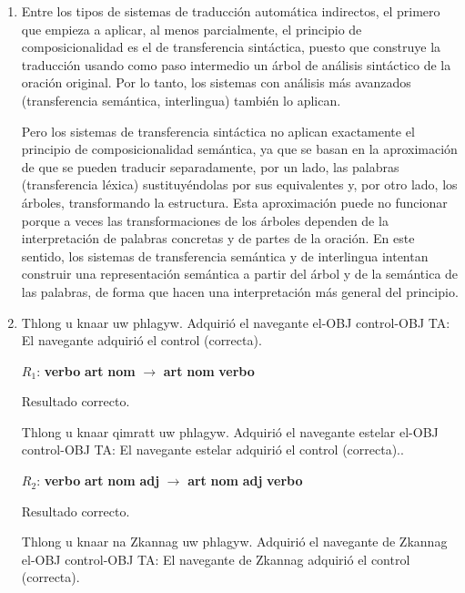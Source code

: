 \begin{enumerate}
\item Entre los tipos de sistemas de traducción automática indirectos, el primero que empieza a aplicar, al menos parcialmente, el principio de composicionalidad es el de transferencia sintáctica, puesto que construye la traducción usando como paso intermedio un árbol de análisis sintáctico de la oración original. Por lo tanto, los sistemas con análisis más avanzados (transferencia semántica, interlingua) también lo aplican. 

Pero los sistemas de transferencia sintáctica no aplican exactamente el principio de composicionalidad semántica, ya que se basan en la aproximación de que se pueden traducir separadamente, por un lado, las palabras (transferencia léxica) sustituyéndolas por sus equivalentes y, por otro lado, los árboles, transformando la estructura. Esta aproximación puede no funcionar porque a veces las transformaciones de los árboles dependen de la interpretación de palabras concretas y de partes de la oración. En este sentido, los sistemas de transferencia semántica y de interlingua intentan construir una representación semántica a partir del árbol y de la semántica de las palabras, de forma que hacen una interpretación más general del principio. 

\item

\begin{example} \gll Thlong u knaar uw phlagyw. {Adquirió} el navegante el-OBJ control-OBJ \glt TA: El navegante adquirió el control (correcta). \glend

\end{example} $R_1$: \textbf{verbo} \textbf{art} \textbf{nom} $\rightarrow$ \textbf{art} \textbf{nom} \textbf{verbo} 

Resultado correcto. 

\begin{example} \gll Thlong u knaar qimratt uw phlagyw. {Adquirió} el navegante estelar el-OBJ control-OBJ \glt TA: El navegante estelar adquirió el control (correcta).. \glend

\end{example} $R_2$: \textbf{verbo} \textbf{art} \textbf{nom} \textbf{adj} $\rightarrow$ \textbf{art} \textbf{nom} \textbf{adj} \textbf{verbo} \begin{example} 

Resultado correcto. 

\gll Thlong u knaar na Zkannag uw phlagyw. {Adquirió} el navegante de Zkannag el-OBJ control-OBJ \glt TA: El navegante de Zkannag adquirió el control (correcta). \glend


\end{example}
\end{enumerate}
